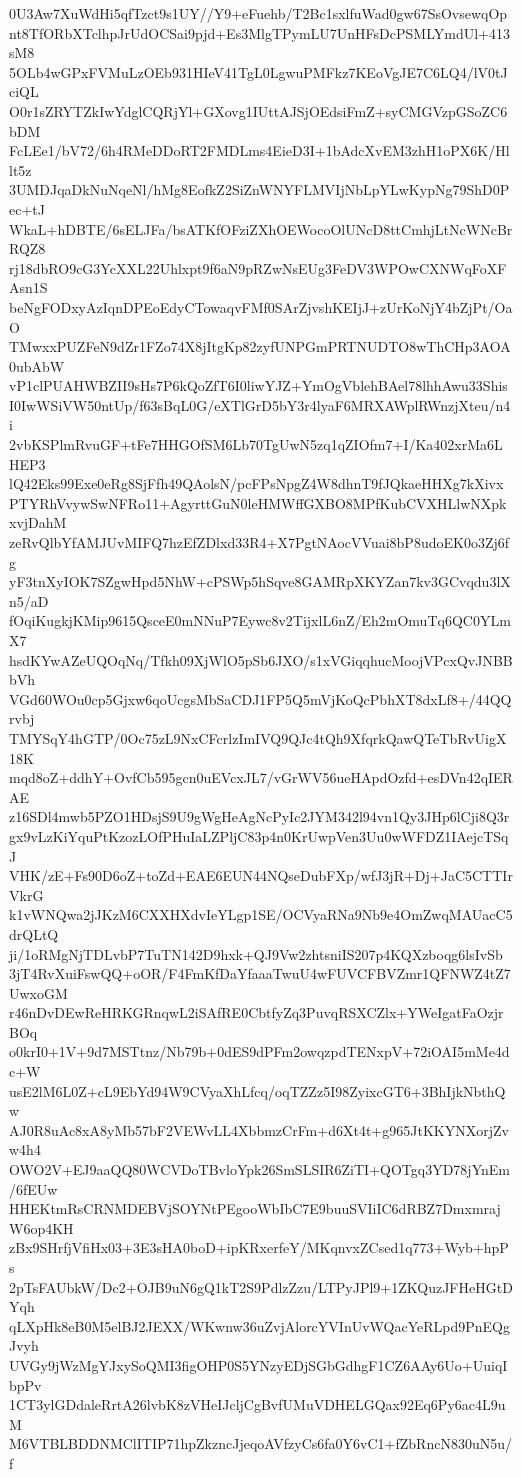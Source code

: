 0U3Aw7XuWdHi5qfTzct9s1UY//Y9+eFuehb/T2Bc1sxlfuWad0gw67SsOvsewqOp
nt8TfORbXTclhpJrUdOCSai9pjd+Es3MlgTPymLU7UnHFsDcPSMLYmdUl+413sM8
5OLb4wGPxFVMuLzOEb931HIeV41TgL0LgwuPMFkz7KEoVgJE7C6LQ4/lV0tJciQL
O0r1sZRYTZkIwYdglCQRjYl+GXovg1IUttAJSjOEdsiFmZ+syCMGVzpGSoZC6bDM
FcLEe1/bV72/6h4RMeDDoRT2FMDLms4EieD3I+1bAdcXvEM3zhH1oPX6K/Hllt5z
3UMDJqaDkNuNqeNl/hMg8EofkZ2SiZnWNYFLMVIjNbLpYLwKypNg79ShD0Pec+tJ
WkaL+hDBTE/6sELJFa/bsATKfOFziZXhOEWocoOlUNcD8ttCmhjLtNcWNcBrRQZ8
rj18dbRO9cG3YcXXL22Uhlxpt9f6aN9pRZwNsEUg3FeDV3WPOwCXNWqFoXFAsn1S
beNgFODxyAzIqnDPEoEdyCTowaqvFMf0SArZjvshKEIjJ+zUrKoNjY4bZjPt/OaO
TMwxxPUZFeN9dZr1FZo74X8jItgKp82zyfUNPGmPRTNUDTO8wThCHp3AOA0ubAbW
vP1clPUAHWBZII9sHs7P6kQoZfT6I0liwYJZ+YmOgVblehBAel78lhhAwu33Shis
I0IwWSiVW50ntUp/f63sBqL0G/eXTlGrD5bY3r4lyaF6MRXAWplRWnzjXteu/n4i
2vbKSPlmRvuGF+tFe7HHGOfSM6Lb70TgUwN5zq1qZIOfm7+I/Ka402xrMa6LHEP3
lQ42Eks99Exe0eRg8SjFfh49QAolsN/pcFPsNpgZ4W8dhnT9fJQkaeHHXg7kXivx
PTYRhVvywSwNFRo11+AgyrttGuN0leHMWffGXBO8MPfKubCVXHLlwNXpkxvjDahM
zeRvQlbYfAMJUvMIFQ7hzEfZDlxd33R4+X7PgtNAocVVuai8bP8udoEK0o3Zj6fg
yF3tnXyIOK7SZgwHpd5NhW+cPSWp5hSqve8GAMRpXKYZan7kv3GCvqdu3lXn5/aD
fOqiKugkjKMip9615QsceE0mNNuP7Eywc8v2TijxlL6nZ/Eh2mOmuTq6QC0YLmX7
hsdKYwAZeUQOqNq/Tfkh09XjWlO5pSb6JXO/s1xVGiqqhucMoojVPcxQvJNBBbVh
VGd60WOu0cp5Gjxw6qoUcgsMbSaCDJ1FP5Q5mVjKoQcPbhXT8dxLf8+/44QQrvbj
TMYSqY4hGTP/0Oc75zL9NxCFcrlzImIVQ9QJc4tQh9XfqrkQawQTeTbRvUigX18K
mqd8oZ+ddhY+OvfCb595gcn0uEVcxJL7/vGrWV56ueHApdOzfd+esDVn42qIERAE
z16SDl4mwb5PZO1HDsjS9U9gWgHeAgNcPyIc2JYM342l94vn1Qy3JHp6lCji8Q3r
gx9vLzKiYquPtKzozLOfPHuIaLZPljC83p4n0KrUwpVen3Uu0wWFDZ1IAejcTSqJ
VHK/zE+Fs90D6oZ+toZd+EAE6EUN44NQseDubFXp/wfJ3jR+Dj+JaC5CTTIrVkrG
k1vWNQwa2jJKzM6CXXHXdvIeYLgp1SE/OCVyaRNa9Nb9e4OmZwqMAUacC5drQLtQ
ji/1oRMgNjTDLvbP7TuTN142D9hxk+QJ9Vw2zhtsniIS207p4KQXzboqg6lsIvSb
3jT4RvXuiFswQQ+oOR/F4FmKfDaYfaaaTwuU4wFUVCFBVZmr1QFNWZ4tZ7UwxoGM
r46nDvDEwReHRKGRnqwL2iSAfRE0CbtfyZq3PuvqRSXCZlx+YWeIgatFaOzjrBOq
o0krI0+1V+9d7MSTtnz/Nb79b+0dES9dPFm2owqzpdTENxpV+72iOAI5mMe4dc+W
usE2lM6L0Z+cL9EbYd94W9CVyaXhLfcq/oqTZZz5I98ZyixcGT6+3BhIjkNbthQw
AJ0R8uAc8xA8yMb57bF2VEWvLL4XbbmzCrFm+d6Xt4t+g965JtKKYNXorjZvw4h4
OWO2V+EJ9aaQQ80WCVDoTBvloYpk26SmSLSIR6ZiTI+QOTgq3YD78jYnEm/6fEUw
HHEKtmRsCRNMDEBVjSOYNtPEgooWbIbC7E9buuSVIiIC6dRBZ7DmxmrajW6op4KH
zBx9SHrfjVfiHx03+3E3sHA0boD+ipKRxerfeY/MKqnvxZCsed1q773+Wyb+hpPs
2pTsFAUbkW/Dc2+OJB9uN6gQ1kT2S9PdlzZzu/LTPyJPl9+1ZKQuzJFHeHGtDYqh
qLXpHk8eB0M5elBJ2JEXX/WKwnw36uZvjAlorcYVInUvWQacYeRLpd9PnEQgJvyh
UVGy9jWzMgYJxySoQMI3figOHP0S5YNzyEDjSGbGdhgF1CZ6AAy6Uo+UuiqIbpPv
1CT3ylGDdaleRrtA26lvbK8zVHeIJcljCgBvfUMuVDHELGQax92Eq6Py6ac4L9uM
M6VTBLBDDNMClITIP71hpZkzncJjeqoAVfzyCs6fa0Y6vC1+fZbRncN830uN5u/f
